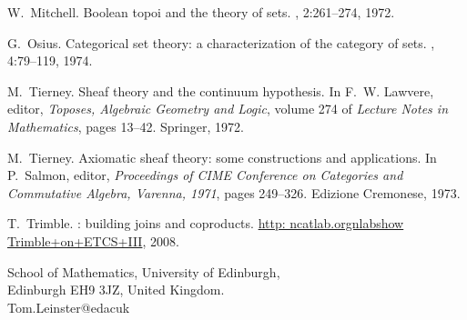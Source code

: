 \documentclass[12pt]{article}
\begin{document}
\begin{thebibliography}{10}
W.~Mitchell.
\newblock Boolean topoi and the theory of sets.
, 2:261--274, 1972.

G.~Osius.
\newblock Categorical set theory: a characterization of the category of sets.
, 4:79--119, 1974.

M.~Tierney.
\newblock Sheaf theory and the continuum hypothesis.
\newblock In F.~W. Lawvere, editor, {\em Toposes, Algebraic Geometry and
  Logic}, volume 274 of {\em Lecture Notes in Mathematics}, pages 13--42.
  Springer, 1972.

M.~Tierney.
\newblock Axiomatic sheaf theory: some constructions and applications.
\newblock In P.~Salmon, editor, {\em Proceedings of CIME Conference on
  Categories and Commutative Algebra, Varenna, 1971}, pages 249--326. Edizione
  Cremonese, 1973.

T.~Trimble.
: building joins and coproducts.
\newblock \href{http://ncatlab.org/nlab/show/Trimble+on+ETCS+III}{http:\dblslsh
  ncatlab.org\slsh nlab\slsh show\slsh
  Trimble+\linebreak[0]on+\linebreak[0]ETCS+III}, 2008.

\end{thebibliography}



\bigskip
\noindent
School of Mathematics,
University of Edinburgh,\\
Edinburgh EH9 3JZ,
United Kingdom.\\
Tom.Leinster\mbox{}@\mbox{}ed\dt ac\dt uk
\end{document}
